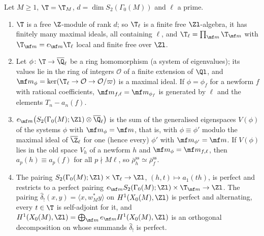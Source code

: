 \begin{proposition}\label{prop:congruence:hecke-local}
Let $M\ge1$, $\T=\T_M$, $d=\dim S_2(\Gamma_0(M))$ and $\ell$ a prime.
\begin{enumerate}[label=(\roman*)]
\item $\T$ is a free $\Z$-module of rank $d$; so $\T_\ell$ is a finite free $\Zl$-algebra, it has finitely many maximal ideals, all containing $\ell$, and
$\T_\ell=\prod_{\mf m}\T_{\mf m}$ with $\T_{\mf m}=e_{\mf m}\T_\ell$ local and finite free over $\Zl$.
\item Let $\phi\colon\T\to\overline\Q_\ell$ be a ring homomorphism (a system of eigenvalues); its values lie in the ring of integers $\mathcal O$ of a finite extension of $\Ql$, and
$\mf m_\phi=\ker(\T_\ell\to\mathcal O\to\mathcal O/\varpi)$ is a maximal ideal. If $\phi=\phi_f$ for a newform $f$ with rational coefficients, $\mf m_{f,\ell}=\mf m_{\phi_f}$ is generated by $\ell$ and
the elements $T_n-a_n(f)$.
\item $e_{\mf m}\bigl(S_2(\Gamma_0(M);\Zl)\otimes\overline\Q_\ell\bigr)$ is the sum of the generalised eigenspaces $V(\phi)$ of the systems $\phi$ with $\mf m_\phi=\mf m$, that is, with
$\phi\equiv\phi'$ modulo the maximal ideal of $\overline\Z_\ell$ for one (hence every) $\phi'$ with $\mf m_{\phi'}=\mf m$. If $V(\phi)$ lies in the old space $V_h$ of a newform $h$ and
$\mf m_\phi=\mf m_{f,\ell}$, then $a_p(h)\equiv a_p(f)$ for all $p\nmid M\ell$, so $\bar\rho_h^{\mathrm{ss}}\simeq\bar\rho_f^{\mathrm{ss}}$.
\item The pairing $S_2(\Gamma_0(M);\Zl)\times\T_\ell\to\Zl$, $(h,t)\mapsto a_1(th)$, is perfect and restricts to a perfect pairing $e_{\mf m}S_2(\Gamma_0(M);\Zl)\times\T_{\mf m}\to\Zl$. The pairing
$\hat\delta_!(x,y)=\langle x,w_M^*y\rangle$ on $H^1(X_0(M),\Zl)$ is perfect and alternating, every $t\in\T$ is self-adjoint for it, and $H^1(X_0(M),\Zl)=\bigoplus_{\mf m}e_{\mf m}H^1(X_0(M),\Zl)$
is an orthogonal decomposition on whose summands $\hat\delta_!$ is perfect.
\end{enumerate}
\end{proposition}

